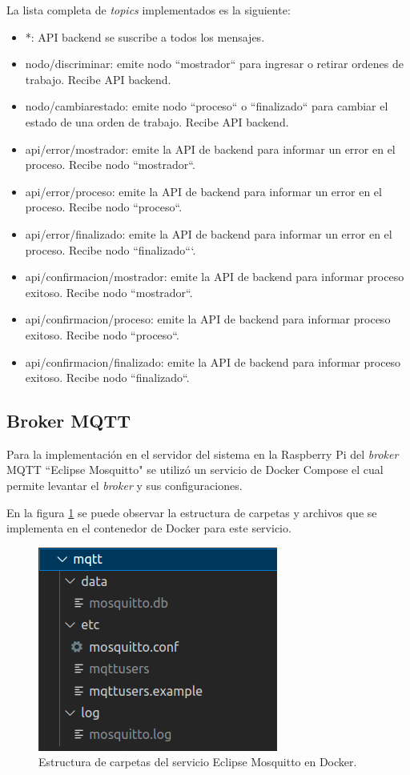 La lista completa de \textit{topics} implementados es la siguiente:
\begin{itemize}
\item *: API backend se suscribe a todos los mensajes.
\item nodo/discriminar: emite nodo ``mostrador`` para ingresar o retirar ordenes de trabajo. Recibe API backend.
\item nodo/cambiarestado: emite nodo ``proceso`` o ``finalizado`` para cambiar el estado de una orden de trabajo. Recibe API backend.
\item api/error/mostrador: emite la API de backend para informar un error en el proceso. Recibe nodo ``mostrador``.
\item api/error/proceso: emite la API de backend para informar un error en el proceso. Recibe nodo ``proceso``.
\item api/error/finalizado: emite la API de backend para informar un error en el proceso. Recibe nodo ``finalizado```.
\item api/confirmacion/mostrador: emite la API de backend para informar proceso exitoso. Recibe nodo ``mostrador``.
\item api/confirmacion/proceso: emite la API de backend para informar proceso exitoso. Recibe nodo ``proceso``.
\item api/confirmacion/finalizado: emite la API de backend para informar proceso exitoso. Recibe nodo ``finalizado``.

\end{itemize}

\subsection{Broker MQTT}
\label{subsec:mqttbroker}

Para la implementación en el servidor del sistema en la Raspberry Pi del \textit{broker} MQTT ``Eclipse Mosquitto" se utilizó un servicio de Docker Compose el cual permite levantar el \textit{broker} y sus configuraciones.

En la figura \ref{fig:mqttestructuracarpetas} se puede observar la estructura de carpetas y archivos que se implementa en el contenedor de Docker para este servicio. 

\begin{figure}[H]
	\centering
	\includegraphics[scale=.60]{./Figures/mqtt-estructura-carpetas.png}
	\caption{Estructura de carpetas del servicio Eclipse Mosquitto en Docker.}
	\label{fig:mqttestructuracarpetas}
\end{figure}

